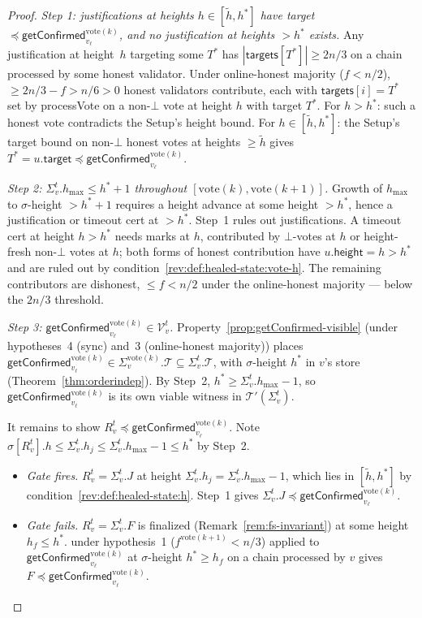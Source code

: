 \documentclass{article}
\newcommand{\T}[0]{\ensuremath{\mathcal{T}}}
\newcommand{\V}[0]{\ensuremath{\mathcal{V}}}
\newcommand{\target}{\mathsf{target}}
\newcommand{\height}{\mathsf{height}}
\newcommand{\targets}{\mathsf{targets}}
\newcommand{\hmax}{\ensuremath{h_{\max}}\xspace}
\newcommand{\processVote}{\textsf{processVote}\xspace}
\newcommand{\vote}{\ensuremath{\mathrm{vote}}}
\newcommand{\comm}[1]{\ensuremath{\widetilde{#1}}}
\newcommand{\getConfirmed}{\textsf{getConfirmed}\xspace}
\theoremstyle{plain}
\theoremstyle{definition}
\theoremstyle{remark}
\begin{document}
\begin{proof}
\medskip

\emph{Step 1: justifications at heights $h \in [\comm{h}, h^\ast]$ have target $\preceq \getConfirmed_{v_\ell}^{\vote(k)}$, and no justification at heights $> h^\ast$ exists.}
Any justification at height~$h$ targeting some $T^\ast$ has $|\targets[T^\ast]| \geq 2n/3$ on a chain processed by some honest validator.
Under online-honest majority ($f < n/2$), $\geq 2n/3 - f > n/6 > 0$ honest validators contribute, each with $\targets[i] = T^\ast$ set by \processVote{} on a non-$\bot$ vote at height $h$ with target $T^\ast$.
For $h > h^\ast$: such a honest vote contradicts the Setup's height bound.
For $h \in [\comm{h}, h^\ast]$: the Setup's target bound on non-$\bot$ honest votes at heights $\geq \comm{h}$ gives $T^\ast = u.\target \preceq \getConfirmed_{v_\ell}^{\vote(k)}$.

\emph{Step 2: $\Sigma_v^t.\hmax \leq h^\ast + 1$ throughout $[\vote(k), \vote(k{+}1)]$.}
Growth of $\hmax$ to $\sigma$-height $> h^\ast + 1$ requires a height advance at some height $> h^\ast$, hence a justification or timeout cert at $> h^\ast$.
Step~1 rules out justifications.
A timeout cert at height $h > h^\ast$ needs marks at $h$, contributed by $\bot$-votes at $h$ or height-fresh non-$\bot$ votes at $h$;
both forms of honest contribution have $u.\height = h > h^\ast$ and are ruled out by condition~\ref{rev:def:healed-state:vote-h}.
The remaining contributors are dishonest, $\leq f < n/2$ under the online-honest majority --- below the $2n/3$ threshold.

\emph{Step 3: $\getConfirmed_{v_\ell}^{\vote(k)} \in \V_v^t$.}
Property~\ref{prop:getConfirmed-visible} (under hypotheses~4 (sync) and~3 (online-honest majority)) places $\getConfirmed_{v_\ell}^{\vote(k)} \in \Sigma_v^{\vote(k)}.\T \subseteq \Sigma_v^t.\T$, with $\sigma$-height $h^\ast$ in $v$'s store (Theorem~\ref{thm:orderindep}).
By Step~2, $h^\ast \geq \Sigma_v^t.\hmax - 1$, so $\getConfirmed_{v_\ell}^{\vote(k)}$ is its own viable witness in $\T'(\Sigma_v^t)$.

It remains to show $R_v^t \preceq \getConfirmed_{v_\ell}^{\vote(k)}$.
Note $\sigma[R_v^t].h \leq \Sigma_v^t.h_j \leq \Sigma_v^t.\hmax - 1 \leq h^\ast$ by Step~2.
\begin{itemize}
  \item \emph{Gate fires.} $R_v^t = \Sigma_v^t.J$ at height $\Sigma_v^t.h_j = \Sigma_v^t.\hmax - 1$, which lies in $[\comm{h}, h^\ast]$ by condition~\ref{rev:def:healed-state:h}.
  Step~1 gives $\Sigma_v^t.J \preceq \getConfirmed_{v_\ell}^{\vote(k)}$.
  \item \emph{Gate fails.} $R_v^t = \Sigma_v^t.F$ is finalized (Remark~\ref{rem:fs-invariant}) at some height $h_f \leq h^\ast$.
   under hypothesis~1 ($f^{\vote(k+1)} < n/3$) applied to $\getConfirmed_{v_\ell}^{\vote(k)}$ at $\sigma$-height $h^\ast \geq h_f$ on a chain processed by $v$ gives $F \preceq \getConfirmed_{v_\ell}^{\vote(k)}$.
\end{itemize}


\end{proof}
\end{document}
